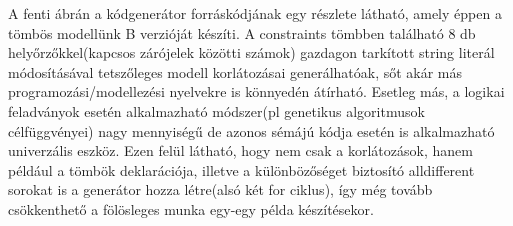 \documentclass[12pt,a4paper,twoside, openright]{report}
\begin{document}
    A fenti ábrán a kódgenerátor forráskódjának egy részlete látható, amely éppen a tömbös modellünk B verzióját készíti. A constraints tömbben található 8 db helyőrzőkkel(kapcsos zárójelek közötti számok) gazdagon tarkított string literál módosításával tetszőleges modell korlátozásai generálhatóak, sőt akár más programozási/modellezési nyelvekre is könnyedén átírható. Esetleg más, a logikai feladványok esetén alkalmazható módszer(pl genetikus algoritmusok célfüggvényei) nagy mennyiségű de azonos sémájú kódja esetén is alkalmazható univerzális eszköz. Ezen felül látható, hogy nem csak a korlátozások, hanem például a tömbök deklarációja, illetve a különbözőséget biztosító alldifferent sorokat is a generátor hozza létre(alsó két for ciklus), így még tovább csökkenthető a fölösleges munka egy-egy példa készítésekor.
    
    
\end{document}
